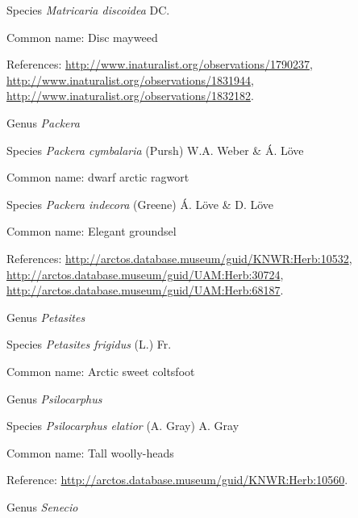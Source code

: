 \documentclass[9pt, article]{memoir}
\begin{document}
\begin{multicols}{2}
\vspace{6pt}\noindent\hspace{36pt}Species \textit{Matricaria discoidea} DC.


Common name: Disc mayweed

References: 
\url{http://www.inaturalist.org/observations/1790237}, 
\url{http://www.inaturalist.org/observations/1831944}, 
\url{http://www.inaturalist.org/observations/1832182}.

\vspace{6pt}\noindent\hspace{30pt}Genus \textit{Packera}


\vspace{6pt}\noindent\hspace{36pt}Species \textit{Packera cymbalaria} (Pursh) W.A. Weber \& Á. Löve


Common name: dwarf arctic ragwort

\vspace{6pt}\noindent\hspace{36pt}Species \textit{Packera indecora} (Greene) Á. Löve \& D. Löve


Common name: Elegant groundsel

References: 
\url{http://arctos.database.museum/guid/KNWR:Herb:10532}, 
\url{http://arctos.database.museum/guid/UAM:Herb:30724}, 
\url{http://arctos.database.museum/guid/UAM:Herb:68187}.

\vspace{6pt}\noindent\hspace{30pt}Genus \textit{Petasites}


\vspace{6pt}\noindent\hspace{36pt}Species \textit{Petasites frigidus} (L.) Fr.


Common name: Arctic sweet coltsfoot

\vspace{6pt}\noindent\hspace{30pt}Genus \textit{Psilocarphus}


\vspace{6pt}\noindent\hspace{36pt}Species \textit{Psilocarphus elatior} (A. Gray) A. Gray


Common name: Tall woolly-heads

Reference: 
\url{http://arctos.database.museum/guid/KNWR:Herb:10560}.

\vspace{6pt}\noindent\hspace{30pt}Genus \textit{Senecio}



\end{multicols}
\end{document}
